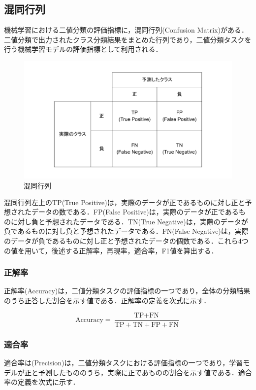 \subsection{混同行列 \label{c4s2-1}}
機械学習における二値分類の評価指標に，混同行列(Confusion Matrix)がある．二値分類で出力されたクラス分類結果をまとめた行列であり，二値分類タスクを行う機械学習モデルの評価指標として利用される．
 
\begin{figure}[H]
	\centering
	\includegraphics[width=150mm]{image/confusion-matrix.png}
	\caption{混同行列}
	\label{confusion-matrix}
\end{figure}

混同行列左上のTP(True Positive)は，実際のデータが正であるものに対し正と予想されたデータの数である．FP(False Positive)は，実際のデータが正であるものに対し負と予想されたデータである．TN(True Negative)は，実際のデータが負であるものに対し負と予想されたデータである．FN(False Negative)は，実際のデータが負であるものに対し正と予想されたデータの個数である．これら4つの値を用いて，後述する正解率，再現率，適合率，F1値を算出する．

\subsubsection{正解率 \label{c4s2-1a}}
正解率(Accuracy)は，二値分類タスクの評価指標の一つであり，全体の分類結果のうち正答した割合を示す値である．正解率の定義を次式に示す．

$$
\text{Accuracy} = \frac{\text{TP}+\text{FN}}{\text{TP}+\text{TN}+\text{FP}+\text{FN}}
$$


\subsubsection{適合率 \label{c4s2-1b}}
適合率は(Precision)は，二値分類タスクにおける評価指標の一つであり，学習モデルが正と予測したもののうち，実際に正であものの割合を示す値である．適合率の定義を次式に示す．

